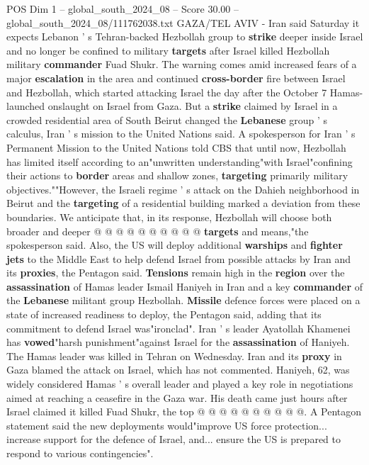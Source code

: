 \begin{textsample}{POS Dim 1 – global\_south\_2024\_08 – Score 30.00 – global\_south\_2024\_08/111762038.txt}  \label{ex:f1_pos_011}
GAZA/TEL AVIV - Iran said Saturday it expects Lebanon ' s Tehran-backed Hezbollah group to \textbf{strike} deeper inside Israel and no longer be confined to military \textbf{targets} after Israel killed Hezbollah military \textbf{commander} Fuad Shukr.
The warning comes amid increased fears of a major \textbf{escalation} in the area and continued \textbf{cross-border} fire between Israel and Hezbollah, which started attacking Israel the day after the October 7 Hamas-launched onslaught on Israel from Gaza.
But a \textbf{strike} claimed by Israel in a crowded residential area of South Beirut changed the \textbf{Lebanese} group ' s calculus, Iran ' s mission to the United Nations said.
A spokesperson for Iran ' s Permanent Mission to the United Nations told CBS that until now, Hezbollah has limited itself according to an"unwritten understanding"with Israel"confining their actions to \textbf{border} areas and shallow zones, \textbf{targeting} primarily military objectives.""However, the Israeli regime ' s attack on the Dahieh neighborhood in Beirut and the \textbf{targeting} of a residential building marked a deviation from these boundaries.
We anticipate that, in its response, Hezbollah will choose both broader and deeper @ @ @ @ @ @ @ @ @ @ \textbf{targets} and means,"the spokesperson said.
Also, the US will deploy additional \textbf{warships} and \textbf{fighter} \textbf{jets} to the Middle East to help defend Israel from possible attacks by Iran and its \textbf{proxies}, the Pentagon said. \textbf{Tensions} remain high in the \textbf{region} over the \textbf{assassination} of Hamas leader Ismail Haniyeh in Iran and a key \textbf{commander} of the \textbf{Lebanese} militant group Hezbollah. \textbf{Missile} defence forces were placed on a state of increased readiness to deploy, the Pentagon said, adding that its commitment to defend Israel was"ironclad".
Iran ' s leader Ayatollah Khamenei has \textbf{vowed}"harsh punishment"against Israel for the \textbf{assassination} of Haniyeh.
The Hamas leader was killed in Tehran on Wednesday.
Iran and its \textbf{proxy} in Gaza blamed the attack on Israel, which has not commented.
Haniyeh, 62, was widely considered Hamas ' s overall leader and played a key role in negotiations aimed at reaching a ceasefire in the Gaza war.
His death came just hours after Israel claimed it killed Fuad Shukr, the top @ @ @ @ @ @ @ @ @ @.
A Pentagon statement said the new deployments would"improve US force protection... increase support for the defence of Israel, and... ensure the US is prepared to respond to various contingencies".

\end{textsample}
